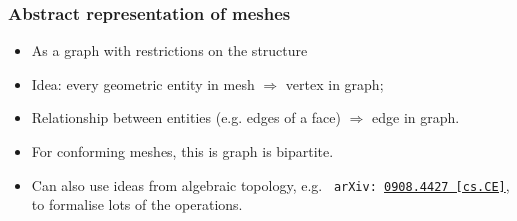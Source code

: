 \documentclass[presentation,aspectratio=43, 10pt]{beamer}
\newcommand{\arxivlink}[2]{{\texttt{arXiv:\,\href{https://arxiv.org/abs/#1}{#1\,[#2]}}}}
\begin{document}
\begin{frame}
  \frametitle{Abstract representation of meshes}
  \begin{itemize}
  \item As a graph with restrictions on the structure
  \item Idea: every geometric entity in mesh $\Rightarrow$ vertex in
    graph;
  \item Relationship between entities (e.g. edges of a face)
    $\Rightarrow$ edge in graph.
  \item For conforming meshes, this is graph is bipartite.
  \item Can also use ideas from algebraic topology, e.g.~\textcite{Knepley:2009}
    \arxivlink{0908.4427}{cs.CE}, to formalise lots of the
    operations.
  \end{itemize}
\end{frame}
\end{document}
